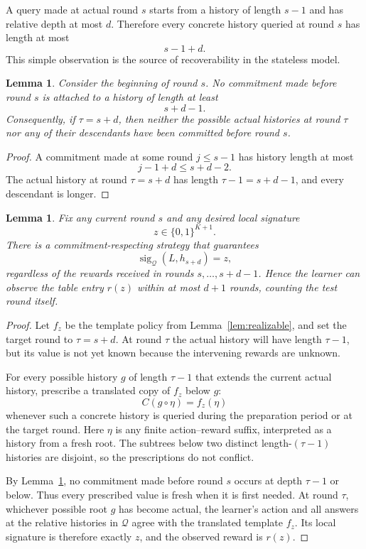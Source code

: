 \documentclass[11pt]{article}
\newtheorem{lemma}[theorem]{Lemma}
\newcommand{\QQ}{\mathcal Q}
\newcommand{\sig}{\operatorname{sig}}
\begin{document}
A query made at actual round $s$ starts from a history of length $s-1$ and has relative depth at most $d$.  Therefore every concrete history queried at round $s$ has length at most
\[
    s-1+d.
\]
This simple observation is the source of recoverability in the stateless model.

\begin{lemma}\label{lem:cleanroot}
Consider the beginning of round $s$.  No commitment made before round $s$ is attached to a history of length at least
\[
    s+d-1.
\]
Consequently, if $\tau=s+d$, then neither the possible actual histories at round $\tau$ nor any of their descendants have been committed before round $s$.
\end{lemma}

\begin{proof}
A commitment made at some round $j\leq s-1$ has history length at most
\[
    j-1+d\leq s+d-2.
\]
The actual history at round $\tau=s+d$ has length $\tau-1=s+d-1$, and every descendant is longer.
\end{proof}

\begin{lemma}\label{lem:scheduled-query}
Fix any current round $s$ and any desired local signature
\[
    z\in\{0,1\}^{K+1}.
\]
There is a commitment-respecting strategy that guarantees
\[
    \sig_{\QQ}(L,h_{s+d})=z,
\]
regardless of the rewards received in rounds $s,\ldots,s+d-1$.  Hence the learner can observe the table entry $r(z)$ within at most $d+1$ rounds, counting the test round itself.
\end{lemma}

\begin{proof}
Let $f_z$ be the template policy from Lemma~\ref{lem:realizable}, and set the target round to $\tau=s+d$.  At round $\tau$ the actual history will have length $\tau-1$, but its value is not yet known because the intervening rewards are unknown.

For every possible history $g$ of length $\tau-1$ that extends the current actual history, prescribe a translated copy of $f_z$ below $g$:
\[
    C(g\circ\eta)=f_z(\eta)
\]
whenever such a concrete history is queried during the preparation period or at the target round.  Here $\eta$ is any finite action--reward suffix, interpreted as a history from a fresh root.  The subtrees below two distinct length-$(\tau-1)$ histories are disjoint, so the prescriptions do not conflict.

By Lemma~\ref{lem:cleanroot}, no commitment made before round $s$ occurs at depth $\tau-1$ or below.  Thus every prescribed value is fresh when it is first needed.  At round $\tau$, whichever possible root $g$ has become actual, the learner's action and all answers at the relative histories in $\QQ$ agree with the translated template $f_z$.  Its local signature is therefore exactly $z$, and the observed reward is $r(z)$.
\end{proof}
\end{document}
